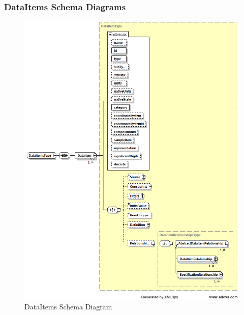 \FloatBarrier


\subsubsection{DataItems Schema Diagrams}
\label{sec:DataItems Schema Diagrams}

\begin{figure}[ht]
  \centering
    \includegraphics[width=1.0\textwidth]{figures/DataItems Schema.png}
  \caption{DataItems Schema Diagram}
  \label{fig:DataItems Schema Diagram}
\end{figure}

\FloatBarrier


